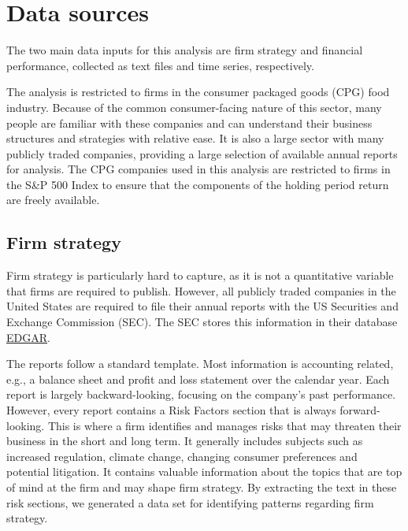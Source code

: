 \documentclass{article}
\begin{document}
\clearpage
\section{Data sources}

The two main data inputs for this analysis are firm strategy and financial performance, collected as text files and time series, respectively. 

The analysis is restricted to firms in the consumer packaged goods (CPG) food industry. Because of the common consumer-facing nature of this sector, many people are familiar with these companies and can understand their business structures and strategies with relative ease. It is also a large sector with many publicly traded companies, providing a large selection of available annual reports for analysis. The CPG companies used in this analysis are restricted to firms in the S\&P 500 Index to ensure that the components of the holding period return are freely available.

\subsection{Firm strategy}
Firm strategy is particularly hard to capture, as it is not a quantitative variable that firms are required to publish. However, all publicly traded companies in the United States are required to file their annual reports with the US Securities and Exchange Commission (SEC). The SEC stores this information in their database \href{https://www.sec.gov/edgar.shtml}{EDGAR}.

 The reports follow a standard template. Most information is accounting related, e.g., a balance sheet and profit and loss statement over the calendar year. Each report is largely backward-looking, focusing on the company's past performance. However, every report contains a Risk Factors section that is always forward-looking. This is where a firm identifies and manages risks that may threaten their business in the short and long term. It generally includes subjects such as increased regulation, climate change, changing consumer preferences and potential litigation. It contains valuable information about the topics that are top of mind at the firm and may shape firm strategy. By extracting the text in these risk sections, we generated a data set for identifying patterns regarding firm strategy. 
\end{document}
